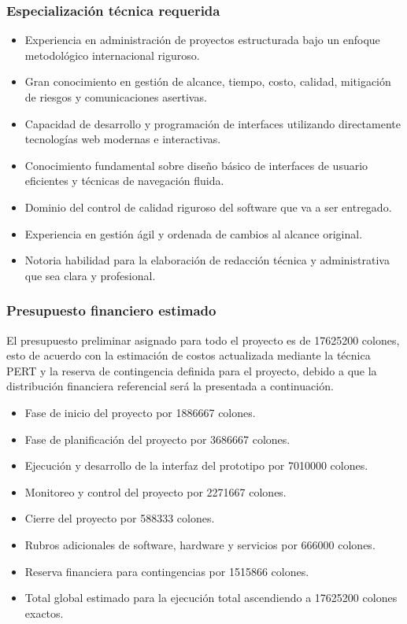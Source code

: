 \documentclass[11pt,spanish]{article}
\begin{document}
\subsubsection{Especialización técnica requerida}

\begin{itemize}
    \item Experiencia en administración de proyectos estructurada bajo un enfoque metodológico internacional riguroso.
    \item Gran conocimiento en gestión de alcance, tiempo, costo, calidad, mitigación de riesgos y comunicaciones asertivas.
    \item Capacidad de desarrollo y programación de interfaces utilizando directamente tecnologías web modernas e interactivas.
    \item Conocimiento fundamental sobre diseño básico de interfaces de usuario eficientes y técnicas de navegación fluida.
    \item Dominio del control de calidad riguroso del software que va a ser entregado.
    \item Experiencia en gestión ágil y ordenada de cambios al alcance original.
    \item Notoria habilidad para la elaboración de redacción técnica y administrativa que sea clara y profesional.
\end{itemize}

\subsubsection{Presupuesto financiero estimado}

El presupuesto preliminar asignado para todo el proyecto es de 17625200 colones, esto de acuerdo con la estimación de costos actualizada mediante la técnica PERT y la reserva de contingencia definida para el proyecto, debido a que la distribución financiera referencial será la presentada a continuación.

\begin{itemize}
    \item Fase de inicio del proyecto por 1886667 colones.
    \item Fase de planificación del proyecto por 3686667 colones.
    \item Ejecución y desarrollo de la interfaz del prototipo por 7010000 colones.
    \item Monitoreo y control del proyecto por 2271667 colones.
    \item Cierre del proyecto por 588333 colones.
    \item Rubros adicionales de software, hardware y servicios por 666000 colones.
    \item Reserva financiera para contingencias por 1515866 colones.
    \item Total global estimado para la ejecución total ascendiendo a 17625200 colones exactos.
\end{itemize}
\end{document}
